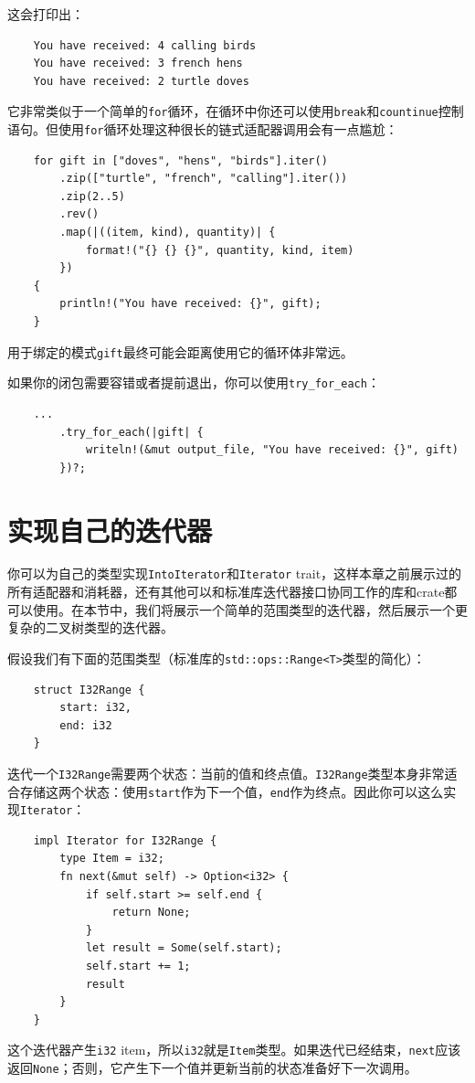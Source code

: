 这会打印出：
\begin{verbatim}
    You have received: 4 calling birds
    You have received: 3 french hens
    You have received: 2 turtle doves
\end{verbatim}

它非常类似于一个简单的\texttt{for}循环，在循环中你还可以使用\texttt{break}和\texttt{countinue}控制语句。但使用\texttt{for}循环处理这种很长的链式适配器调用会有一点尴尬：
\begin{verbatim}
    for gift in ["doves", "hens", "birds"].iter()
        .zip(["turtle", "french", "calling"].iter())
        .zip(2..5)
        .rev()
        .map(|((item, kind), quantity)| {
            format!("{} {} {}", quantity, kind, item)
        })
    {
        println!("You have received: {}", gift);
    }
\end{verbatim}

用于绑定的模式\texttt{gift}最终可能会距离使用它的循环体非常远。

如果你的闭包需要容错或者提前退出，你可以使用\texttt{try\_for\_each}：
\begin{verbatim}
    ...
        .try_for_each(|gift| {
            writeln!(&mut output_file, "You have received: {}", gift)
        })?;
\end{verbatim}

\section{实现自己的迭代器}

你可以为自己的类型实现\texttt{IntoIterator}和\texttt{Iterator} trait，这样本章之前展示过的所有适配器和消耗器，还有其他可以和标准库迭代器接口协同工作的库和crate都可以使用。在本节中，我们将展示一个简单的范围类型的迭代器，然后展示一个更复杂的二叉树类型的迭代器。

假设我们有下面的范围类型（标准库的\texttt{std::ops::Range<T>}类型的简化）：
\begin{verbatim}
    struct I32Range {
        start: i32,
        end: i32
    }
\end{verbatim}

迭代一个\texttt{I32Range}需要两个状态：当前的值和终点值。\texttt{I32Range}类型本身非常适合存储这两个状态：使用\texttt{start}作为下一个值，\texttt{end}作为终点。因此你可以这么实现\texttt{Iterator}：
\begin{verbatim}
    impl Iterator for I32Range {
        type Item = i32;
        fn next(&mut self) -> Option<i32> {
            if self.start >= self.end {
                return None;
            }
            let result = Some(self.start);
            self.start += 1;
            result
        }
    }
\end{verbatim}
这个迭代器产生\texttt{i32} item，所以\texttt{i32}就是\texttt{Item}类型。如果迭代已经结束，\texttt{next}应该返回\texttt{None}；否则，它产生下一个值并更新当前的状态准备好下一次调用。


